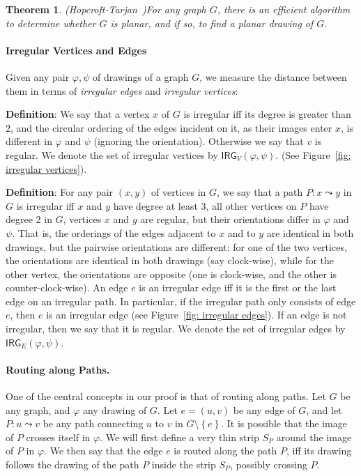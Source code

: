 \documentclass[twoside,leqno,twocolumn]{article}
\newcommand{\connect}{\leadsto}
\newcommand{\set}[1]{\left\{ #1 \right\}}
\newtheorem{theorem}{Theorem}
\newenvironment{Definition}{{\bf Definition}: }{}
\renewcommand{\phi}{\varphi}
\newcommand{\irreg}{\mathsf{IRG}}
\begin{document}
\begin{theorem}(Hopcroft-Tarjan~\cite{planar-drawing})\label{thm:planar drawing}
For any graph $G$, there is an efficient algorithm to determine whether $G$ is planar, and if so, to find a planar drawing of $G$.
\end{theorem}

\paragraph{Irregular Vertices and Edges}
Given any pair $\phi,\psi$ of drawings of a graph $G$, we measure the distance between them in terms of \textit{irregular edges} and \textit{irregular vertices}:

\begin{Definition}
We say that a vertex $x$ of $G$ is irregular iff its degree is greater than $2$, 
and the circular ordering of the edges incident on it, as their images enter $x$, is different in $\phi$ and $\psi$ (ignoring the orientation). Otherwise we say that $v$ is regular.
We denote the set of irregular vertices by $\irreg_V(\phi, \psi)$. (See Figure~\ref{fig: irregular vertices}).
\end{Definition}

\begin{Definition}
For any pair $(x,y)$ of vertices in $G$,
we say that a path $P:x\connect y$ in $G$ is irregular iff $x$ and $y$ have degree at least $3$, all other
vertices on $P$ have degree $2$ in $G$, vertices $x$ and $y$ are regular, but their
orientations differ in $\phi$ and $\psi$. That is, the orderings of the edges adjacent to $x$ and to $y$ are identical in both drawings, but the pairwise orientations are different: for one of the two vertices, the orientations are identical in both drawings (say clock-wise), while for the other vertex, the orientations are opposite (one is clock-wise, and the other is counter-clock-wise). An edge $e$ is an irregular edge iff it is the first or the last edge on an irregular path. In particular, if the irregular path only consists of edge $e$, then $e$ is an irregular edge (see Figure~\ref{fig: irregular edges}). If an edge is not irregular, then we say that it is regular.
We denote the set of irregular edges by $\irreg_E(\phi, \psi)$.
\end{Definition}










\paragraph{Routing along Paths.} One of the central concepts in our proof is  that of routing along paths. Let $G$ be any graph, and $\phi$ any drawing of $G$. Let $e=(u,v)$ be any edge of $G$, and let $P:u\connect v$ be any path connecting $u$ to $v$ in $G\setminus \set{e}$. It is possible that the image of $P$ crosses itself in $\phi$. We will first define a very thin strip $S_P$ around the image of $P$ in $\phi$. We then say that the edge $e$ is routed along the path $P$, iff its drawing follows the drawing of the path $P$ inside the strip $S_P$, possibly crossing $P$.
\end{document}
